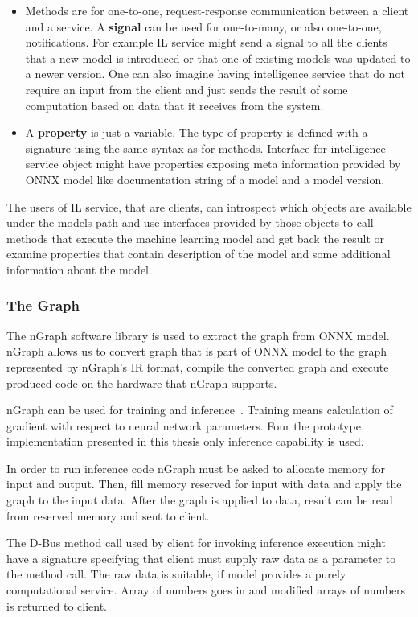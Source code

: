 \documentclass[english, 12pt, a4paper, elec, utf8, online]{aaltothesis}
\begin{document}
\begin{itemize}
\item
Methods are for one-to-one, request-response communication between a client and a service. A \textbf{signal} can be used for one-to-many, or also one-to-one, notifications. For example IL service might send a signal to all the clients that a new model is introduced or that one of existing models was updated to a newer version. One can also imagine having intelligence service that do not require an input from the client and just sends the result of some computation based on data that it receives from the system. 
\item 
A \textbf{property} is just a variable. The type of property is defined with a signature using the same syntax as for methods. Interface for intelligence service object might have properties exposing meta information provided by ONNX model like documentation string of a model and a model version.        
\end{itemize}

The users of IL service, that are clients, can introspect which objects are available under the models path and use interfaces provided by those objects to call methods that execute the machine learning model and get back the result or examine properties that contain description of the model and some additional information about the model.       


\subsubsection{The Graph}
The nGraph software library is used to extract the graph from ONNX model. nGraph allows us to convert graph that is part of ONNX model to the graph represented by nGraph's  IR format, compile the converted graph and execute produced code on the hardware that nGraph supports. 

nGraph can be used for training and inference~\cite{cyphers2018intel}. Training means calculation of gradient with respect to neural network parameters. Four the prototype implementation presented in this thesis only inference capability is used. 

In order to run inference code nGraph must be asked to allocate memory for input and output. Then, fill memory reserved for input with data and apply the graph to the input data. After the graph is applied to data, result can be read from reserved memory and sent to client. 

The D-Bus method call used by client for invoking inference execution might have a signature specifying that client must supply raw data as a parameter to the method call. The raw data is suitable, if model provides a purely computational service. Array of numbers goes in and modified arrays of numbers is returned to client. 
\end{document}
